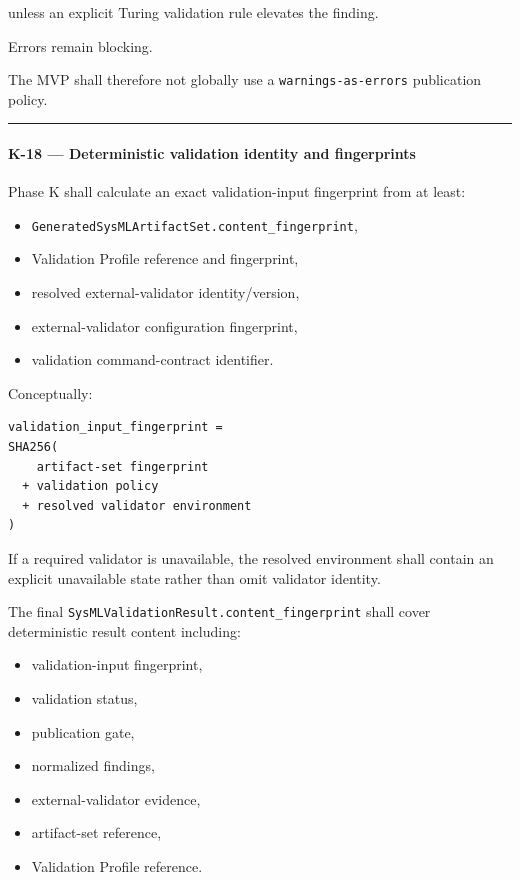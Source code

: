 unless an explicit Turing validation rule elevates the finding.

Errors remain blocking.

The MVP shall therefore not globally use a \texttt{warnings-as-errors} publication policy.

\begin{center}\rule{0.5\linewidth}{0.5pt}\end{center}

\hypertarget{k-18--deterministic-validation-identity-and-fingerprints}{%
\paragraph{K-18 --- Deterministic validation identity and fingerprints}\label{k-18--deterministic-validation-identity-and-fingerprints}}

Phase K shall calculate an exact validation-input fingerprint from at least:

\begin{itemize}
\tightlist
\item
  \texttt{GeneratedSysMLArtifactSet.content\_fingerprint},
\item
  Validation Profile reference and fingerprint,
\item
  resolved external-validator identity/version,
\item
  external-validator configuration fingerprint,
\item
  validation command-contract identifier.
\end{itemize}

Conceptually:

\begin{verbatim}
validation_input_fingerprint =
SHA256(
    artifact-set fingerprint
  + validation policy
  + resolved validator environment
)
\end{verbatim}

If a required validator is unavailable, the resolved environment shall contain an explicit unavailable state rather than omit validator identity.

The final \texttt{SysMLValidationResult.content\_fingerprint} shall cover deterministic result content including:

\begin{itemize}
\tightlist
\item
  validation-input fingerprint,
\item
  validation status,
\item
  publication gate,
\item
  normalized findings,
\item
  external-validator evidence,
\item
  artifact-set reference,
\item
  Validation Profile reference.
\end{itemize}

